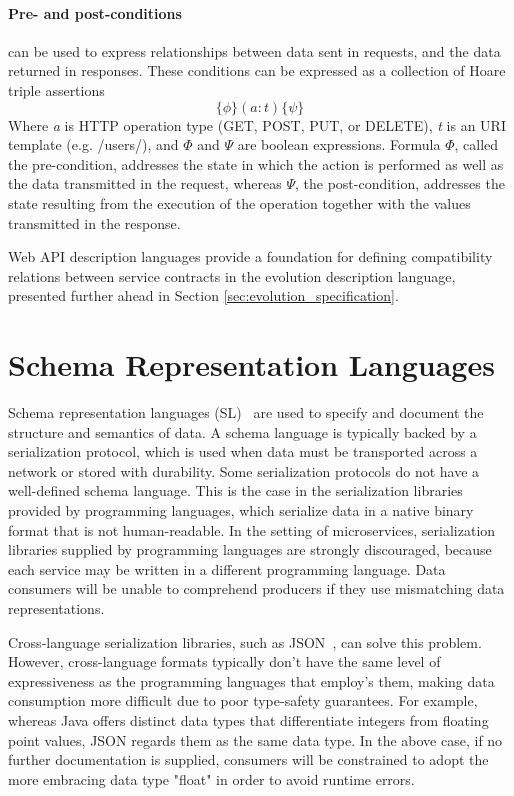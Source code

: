 \paragraph{Pre- and post-conditions}can be used to express relationships between data sent in
requests, and the data returned in responses. These conditions can be expressed as a collection of Hoare triple assertions
\[ \{\phi\} (a : t) \{\psi\} \]
Where \emph{a} is HTTP operation type (GET, POST, PUT, or DELETE), \emph{t} is an URI template (e.g. /users/), and $\Phi$ and $\Psi$ are boolean expressions.
Formula $\Phi$, called the pre-condition, addresses the state in which the action is performed as well as the data transmitted in the request,
whereas $\Psi$, the post-condition, addresses the state resulting from the execution of the operation together with the values transmitted in the response.

Web API description languages provide a foundation for defining compatibility relations between service contracts in the evolution description language,
presented further ahead in Section \ref{sec:evolution_specification}.

\section{Schema Representation Languages} %
\label{sec:schema_representation_languages}

Schema representation languages (SL)~\cite{schemalanguagetaxonomy} are used to specify and document the structure and semantics of data.
A schema language is typically backed by a serialization protocol, which is used when data must be transported across a network or stored with durability.
Some serialization protocols do not have a well-defined schema language.
This is the case in the serialization libraries provided by programming languages, which serialize data in a native binary format that is not human-readable.
In the setting of microservices, serialization libraries supplied by programming languages are strongly discouraged,
because each service may be written in a different programming language.
Data consumers will be unable to comprehend producers if they use mismatching data representations.

Cross-language serialization libraries, such as JSON~\cite{json}, can solve this problem.
However, cross-language formats typically don't have the same level of expressiveness as the programming languages that employ's them,
making data consumption more difficult due to poor type-safety guarantees.
For example, whereas Java offers distinct data types that differentiate integers from floating point values, JSON regards them as the same data type.
In the above case, if no further documentation is supplied, consumers will be constrained to adopt the more embracing data type "float" in order to avoid runtime errors.

